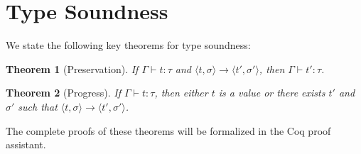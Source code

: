 \documentclass{article}
\newtheorem{theorem}{Theorem}
\begin{document}
\section{Type Soundness}

We state the following key theorems for type soundness:

\begin{theorem}[Preservation]
If $\Gamma \vdash t : \tau$ and $\langle t, \sigma \rangle \longrightarrow \langle t', \sigma' \rangle$, then $\Gamma \vdash t' : \tau$.
\end{theorem}

\begin{theorem}[Progress]
If $\Gamma \vdash t : \tau$, then either $t$ is a value or there exists $t'$ and $\sigma'$ such that $\langle t, \sigma \rangle \longrightarrow \langle t', \sigma' \rangle$.
\end{theorem}

The complete proofs of these theorems will be formalized in the Coq proof assistant.
\end{document}
